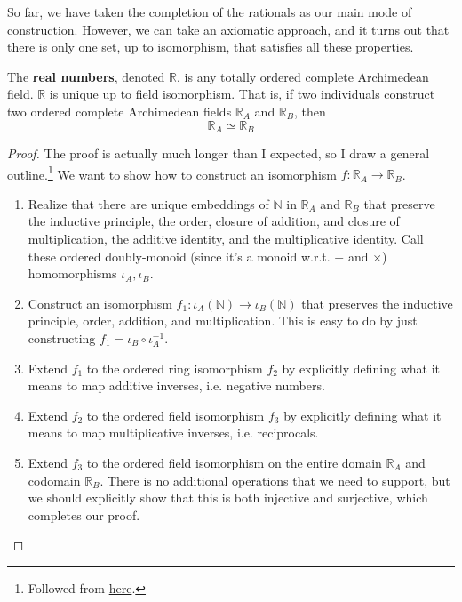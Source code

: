   So far, we have taken the completion of the rationals as our main mode of construction. However, we can take an axiomatic approach, and it turns out that there is only one set, up to isomorphism, that satisfies all these properties. 

  \begin{theorem}
    The \textbf{real numbers}, denoted $\mathbb{R}$, is any totally ordered complete Archimedean field. $\mathbb{R}$ is unique up to field isomorphism. That is, if two individuals construct two ordered complete Archimedean fields $\mathbb{R}_A$ and $\mathbb{R}_B$, then 
    \begin{equation}
      \mathbb{R}_A \simeq \mathbb{R}_B
    \end{equation}
  \end{theorem} 
  \begin{proof}
    The proof is actually much longer than I expected, so I draw a general outline.\footnote{Followed from \href{https://math.ucr.edu/~res/math205A/uniqreals.pdf}{here}.} We want to show how to construct an isomorphism $f: \mathbb{R}_A \rightarrow \mathbb{R}_B$. 
    \begin{enumerate}
      \item Realize that there are unique embeddings of $\mathbb{N}$ in $\mathbb{R}_A$ and $\mathbb{R}_B$ that preserve the inductive principle, the order, closure of addition, and closure of multiplication, the additive identity, and the multiplicative identity. Call these ordered doubly-monoid (since it's a monoid w.r.t. $+$ and $\times$) homomorphisms $\iota_A, \iota_B$. 
      \item Construct an isomorphism $f_1: \iota_A(\mathbb{N}) \rightarrow \iota_B(\mathbb{N})$ that preserves the inductive principle, order, addition, and multiplication. This is easy to do by just constructing $f_1 = \iota_B \circ \iota_A^{-1}$. 
      \item Extend $f_1$ to the ordered ring isomorphism $f_2$ by explicitly defining what it means to map additive inverses, i.e. negative numbers. 
      \item Extend $f_2$ to the ordered field isomorphism $f_3$ by explicitly defining what it means to map multiplicative inverses, i.e. reciprocals. 
      \item Extend $f_3$ to the ordered field isomorphism on the entire domain $\mathbb{R}_A$ and codomain $\mathbb{R}_B$. There is no additional operations that we need to support, but we should explicitly show that this is both injective and surjective, which completes our proof. 
    \end{enumerate}
  \end{proof}

